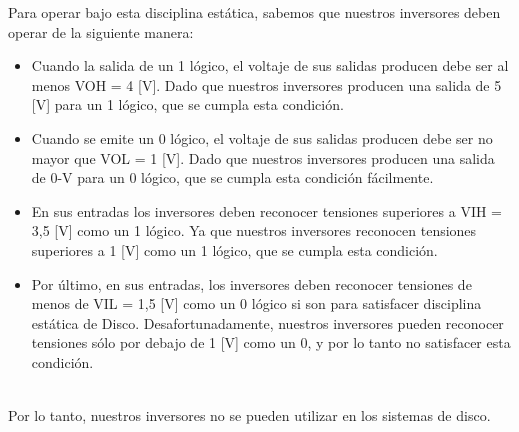 \documentclass[11pt,fancy,lang=es]{elegantbook}
\begin{document}
    {Para operar bajo esta disciplina estática, sabemos que nuestros
    inversores deben operar de la siguiente manera:}\\

    \begin{itemize}
        \item Cuando la salida de un 1 lógico, el voltaje de sus salidas
              producen debe ser al menos VOH = 4 [V]. Dado que nuestros inversores producen
              una salida de 5 [V] para un 1 lógico, que se cumpla esta condición.
        \item Cuando se emite un 0 lógico, el voltaje de sus salidas producen
              debe ser no mayor que VOL = 1 [V]. Dado que nuestros inversores producen
              una salida de 0-V para un 0 lógico, que se cumpla esta condición
              fácilmente.
        \item En sus entradas los inversores deben reconocer tensiones superiores
              a VIH = 3,5 [V] como un 1 lógico. Ya que nuestros inversores reconocen
              tensiones superiores a 1 [V] como un 1 lógico, que se cumpla esta
              condición.
        \item Por último, en sus entradas, los inversores deben reconocer
              tensiones de menos de VIL = 1,5 [V] como un 0 lógico si son para
              satisfacer disciplina estática de Disco. Desafortunadamente, nuestros
              inversores pueden reconocer tensiones sólo por debajo de 1 [V] como
              un 0, y por lo tanto no satisfacer esta condición.
    \end{itemize}\\


    {Por lo tanto, nuestros inversores no se pueden utilizar en los sistemas
    de disco.}
\end{document}
